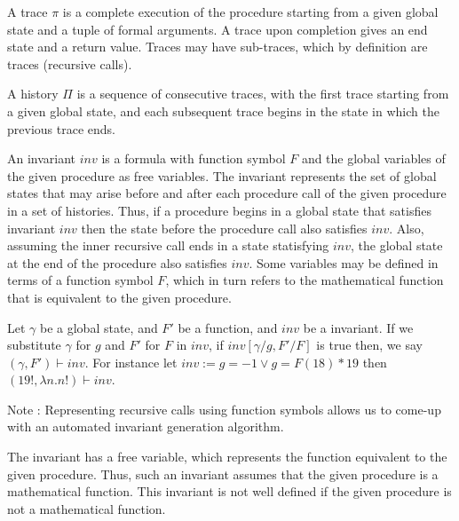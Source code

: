 \documentclass{llncs}
\newcommand{\trace}{\pi}
\newcommand{\inv}{\mathit{inv}}
\newcommand{\history}{\Pi}
\newcommand{\F}{\mathit{F}}
\newcommand{\gstate}{\gamma}
\newcommand{\satisfies}{\vdash}
\begin{document}
\begin{definition}[trace]
  A trace $\trace$ is a complete execution of the procedure starting
  from a given global state and a tuple of formal arguments. A trace
  upon completion gives an end state and a return value. Traces may
  have sub-traces, which by definition are traces (recursive calls).
\end{definition}

\begin{definition}[history]
  A history $\history$ is a sequence of consecutive traces, with the
  first trace starting from a given global state, and each subsequent
  trace begins in the state in which the previous trace ends.
\end{definition}

\begin{definition}[invariant]
  An invariant $\inv$ is a formula with function symbol $\F$ and the
  global variables of the given procedure as free variables. The
  invariant represents the set of global states that may arise before
  and after each procedure call of the given procedure in a set of
  histories. Thus, if a procedure begins in a global state that
  satisfies invariant $\inv$ then the state before the procedure call
  also satisfies $\inv$. Also, assuming the inner recursive call ends
  in a state statisfying $\inv$, the global state at the end of the
  procedure also satisfies $\inv$.
  Some variables may be defined in terms of a
  function symbol $\F$, which in turn refers to the mathematical
  function that is equivalent to the given procedure.
  
  Let $\gstate$ be a global state, and $\F'$ be a function, and $\inv$
  be a invariant. If we substitute $\gstate$ for $g$ and $\F'$ for
  $\F$ in $\inv$, if $\inv[\gstate/g, \F'/\F]$ is true then, we say
  $(\gstate, \F') \satisfies \inv$. For instance let $\inv := g = -1
  \vee g = \F(18) * 19$ then $(19!, \lambda n. n!) \satisfies \inv$.
\end{definition}

Note : Representing recursive calls using function symbols allows us
to come-up with an automated invariant generation algorithm.

The invariant has a free variable, which represents the function
equivalent to the given procedure. Thus, such an invariant assumes
that the given procedure is a mathematical function. This invariant is
not well defined if the given procedure is not a mathematical
function. 
\end{document}
